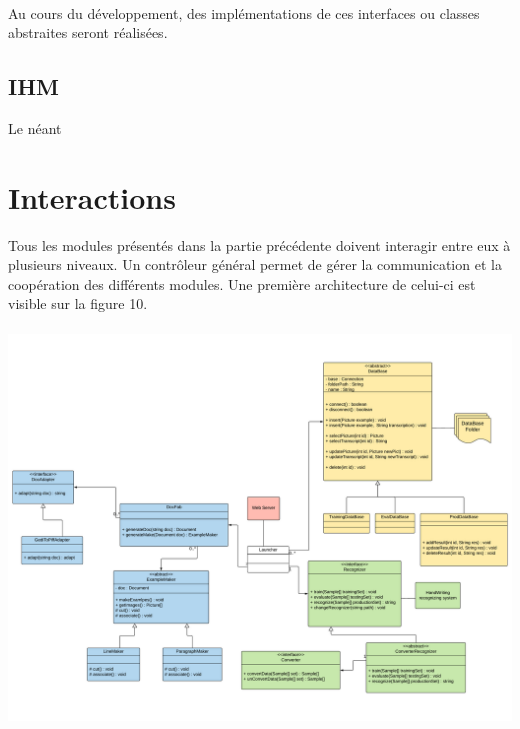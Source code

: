 \paragraph{}

Au cours du développement, des implémentations de ces interfaces ou classes abstraites seront réalisées.

\subsection{IHM}

Le néant

\section{Interactions}

Tous les modules présentés dans la partie précédente doivent interagir entre eux à plusieurs niveaux. Un contrôleur général permet de gérer la communication et la coopération des différents modules. Une première architecture de celui-ci est visible sur la figure 10.

\paragraph{}

\begin{mdframed}[frametitle={Figure 10 : Diagramme de classes du contrôleur}, innerbottommargin=10]
\begin{center}
\includegraphics[width=\linewidth]{Specifications.pdf}
\end{center}
\end{mdframed}

